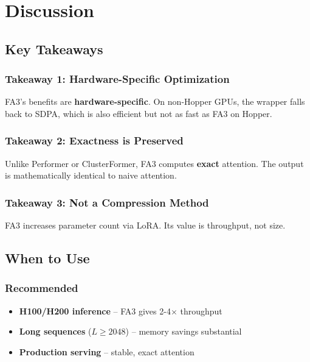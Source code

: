 \section{Discussion}

\subsection{Key Takeaways}

\subsubsection{Takeaway 1: Hardware-Specific Optimization}

FA3's benefits are \textbf{hardware-specific}. On non-Hopper GPUs, the wrapper 
falls back to SDPA, which is also efficient but not as fast as FA3 on 
Hopper.

\subsubsection{Takeaway 2: Exactness is Preserved}

Unlike Performer or ClusterFormer, FA3 computes \textbf{exact} attention. The 
output is mathematically identical to naive attention.

\subsubsection{Takeaway 3: Not a Compression Method}

FA3 increases parameter count via LoRA. Its value is throughput, not size.

\subsection{When to Use}

\subsubsection{Recommended}
\begin{itemize}
\item \textbf{H100/H200 inference} -- FA3 gives 2-4$\times$ throughput
\item \textbf{Long sequences} ($L \geq 2048$) -- memory savings substantial
\item \textbf{Production serving} -- stable, exact attention

\end{itemize}
